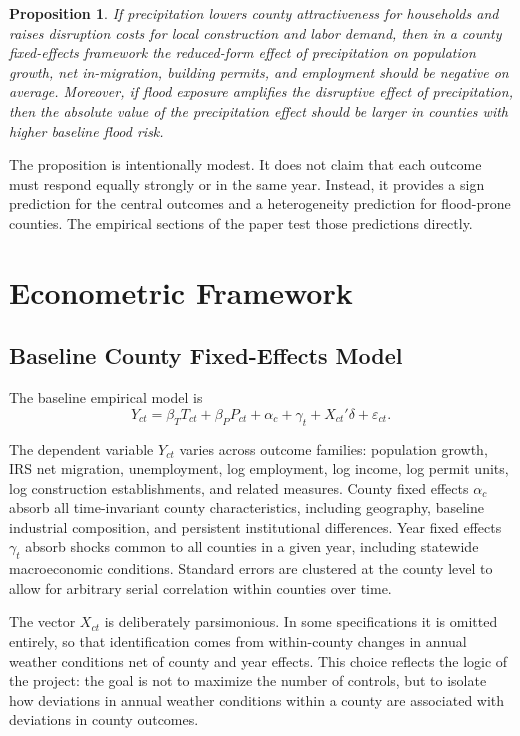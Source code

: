 \documentclass[12pt]{article}
\newtheorem{proposition}{Proposition}
\begin{document}
\begin{proposition}
If precipitation lowers county attractiveness for households and raises disruption costs for local construction and labor demand, then in a county fixed-effects framework the reduced-form effect of precipitation on population growth, net in-migration, building permits, and employment should be negative on average. Moreover, if flood exposure amplifies the disruptive effect of precipitation, then the absolute value of the precipitation effect should be larger in counties with higher baseline flood risk.
\end{proposition}

The proposition is intentionally modest. It does not claim that each outcome must respond equally strongly or in the same year. Instead, it provides a sign prediction for the central outcomes and a heterogeneity prediction for flood-prone counties. The empirical sections of the paper test those predictions directly.

\section{Econometric Framework}

\subsection{Baseline County Fixed-Effects Model}

The baseline empirical model is
\begin{equation}
Y_{ct} = \beta_T T_{ct} + \beta_P P_{ct} + \alpha_c + \gamma_t + X_{ct}'\delta + \varepsilon_{ct}.
\end{equation}

The dependent variable $Y_{ct}$ varies across outcome families: population growth, IRS net migration, unemployment, log employment, log income, log permit units, log construction establishments, and related measures. County fixed effects $\alpha_c$ absorb all time-invariant county characteristics, including geography, baseline industrial composition, and persistent institutional differences. Year fixed effects $\gamma_t$ absorb shocks common to all counties in a given year, including statewide macroeconomic conditions. Standard errors are clustered at the county level to allow for arbitrary serial correlation within counties over time.

The vector $X_{ct}$ is deliberately parsimonious. In some specifications it is omitted entirely, so that identification comes from within-county changes in annual weather conditions net of county and year effects. This choice reflects the logic of the project: the goal is not to maximize the number of controls, but to isolate how deviations in annual weather conditions within a county are associated with deviations in county outcomes.
\end{document}

